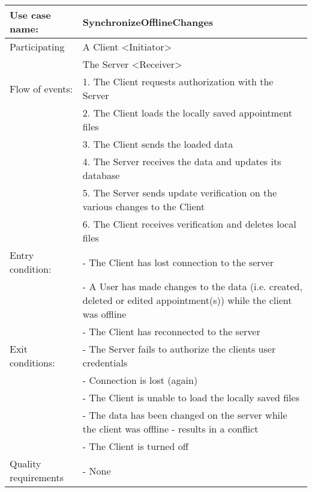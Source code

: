 {\tabulinesep=1.2mm
\begin{tabu}{ | p{3cm} | p{13cm} |}
    \hline
    Use case name: 			& 		SynchronizeOfflineChanges\\ \hline
    Participating  			& 		A Client <Initiator> \\ 
    						&		The Server <Receiver>  \\\hline
    Flow of events: 		& 		1. The Client requests authorization with the Server\\
							&		2. The Client loads the locally saved appointment files\\
							&		3. The Client sends the loaded data\\
							&		4. The Server receives the data and updates its database\\
							&		5. The Server sends update verification on the various changes to the Client\\
							&		6. The Client receives verification and deletes local files\\ \hline
    Entry condition: 		& 		- The Client has lost connection to the server\\ 
    						&		- A User has made changes to the data (i.e. created, deleted or edited appointment(s)) while the client was offline\\
    						&		- The Client has reconnected to the server\\\hline
	Exit conditions: 		&		- The Server fails to authorize the clients user credentials\\ 
							&		- Connection is lost (again) \\
							&		- The Client is unable to load the locally saved files \\
							&		- The data has been changed on the server while the client was offline - results in a conflict \\
							&		- The Client is turned off \\\hline
	Quality requirements	&	 	- None \\\hline
\end{tabu}
}